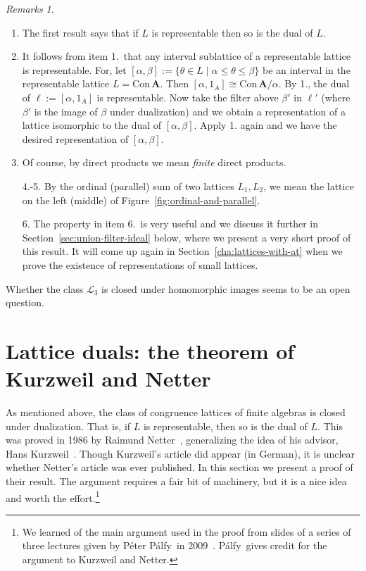 \documentclass[cm,dissertation,actual,final]{uhthesis}
\theoremstyle{plain}
\theoremstyle{definition}
\theoremstyle{remark}
\newtheorem*{remarks}{Remarks}
\numberwithin{theorem}{section}
\numberwithin{claim}{chapter}
\numberwithin{equation}{section}
\numberwithin{conjecture}{chapter}
\newcommand{\Palfy}{P\'alfy}
\newcommand{\<}{\ensuremath{\langle}}
\renewcommand{\>}{\ensuremath{\rangle}}
\renewcommand{\leq}{\ensuremath{\leqslant}}
\newcommand{\Con}{\ensuremath{\mathrm{Con\,}}}
\newcommand{\0}{\ensuremath{\mathbf{0}}}
\newcommand{\1}{\ensuremath{\mathbf{1}}}
\newcommand{\2}{\ensuremath{\mathbf{2}}}
\newcommand{\3}{\ensuremath{\mathbf{3}}}
\newcommand{\4}{\ensuremath{\mathbf{4}}}
\newcommand{\5}{\ensuremath{\mathbf{5}}}
\newcommand{\bA}{\ensuremath{\mathbf{A}}}
\newcommand{\bB}{\ensuremath{\mathbf{B}}}
\newcommand{\sL}{\ensuremath{\mathscr{L}}}
\begin{document}
      \begin{remarks}
        ~
      \begin{enumerate} %
      \item  The first result says that if $L$ is representable then so is the
        dual of $L$. 
        \item It follows from item 1.~that any interval sublattice of a representable lattice is
        representable.  For, let $[\alpha, \beta] := \{\theta \in L \mid \alpha \leq \theta \leq \beta\}$ be an
        interval in the representable lattice $L= \Con\bA$.  Then $[\alpha, 1_A] \cong \Con
        \bA/\alpha$. By 1., the dual of $\ell := [\alpha, 1_A]$ is
        representable. %
        Now take the filter above $\beta'$ in $\ell'$ (where $\beta'$ is the
        image of $\beta$ under dualization) and we obtain a representation of a
        lattice isomorphic to the dual of $[\alpha, \beta]$.  Apply 1.
        again and we have the desired representation of $[\alpha, \beta]$.

      \item Of course, by direct products we mean \emph{finite} direct products.
      \item[4.-5.] By the
          
        ordinal (parallel) sum of two lattices $L_1, L_2$, we mean the lattice
        on the left (middle) of Figure~\ref{fig:ordinal-and-parallel}.

\item[6.] The property in item 6.~is very useful and we discuss it further in
  Section~\ref{sec:union-filter-ideal} below, where we present a very short proof of
  this result.  It will come up again in
  Section~\ref{cha:lattices-with-at} when we prove the existence of
  representations of small lattices.
      \end{enumerate}
      Whether the class $\sL_3$ is closed under homomorphic images
      seems to be an open question. 
      \end{remarks}


\section{Lattice duals: the theorem of Kurzweil and Netter}
\label{sec:duals-interv-subl-detail}
As mentioned above, 
the class of congruence lattices of finite algebras is closed under
dualization.
That is, if $L$ is representable, then so is the dual of $L$. This was proved in
%
1986 by Raimund Netter~\cite{Netter:1986}, generalizing the idea of his advisor,
%
Hans Kurzweil~\cite{Kurzweil:1985}. 
Though Kurzweil's article did appear (in German), it is unclear whether Netter's
article was ever published.
In this section we present a proof of their result.
The argument requires a fair bit of machinery, but it is a nice idea and
worth the effort.\footnote{We learned 
  of the main argument used in the proof from slides of a series of three
%
  lectures given by P{\'e}ter \Palfy\ in 2009~\cite{Palfy:2009}.
  \Palfy\ gives credit for the argument to Kurzweil and Netter.} 
\end{document}
